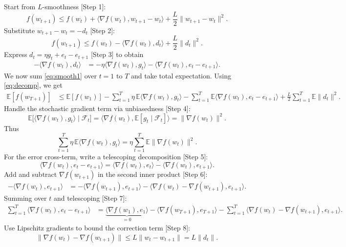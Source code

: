 \documentclass[11pt]{article}
\newcommand{\E}{\mathbb{E}}
\begin{document}
Start from $L$-smoothness [Step 1]:
\[
f(w_{t+1}) \le f(w_t) + \langle \nabla f(w_t), w_{t+1}-w_t\rangle + \frac{L}{2}\|w_{t+1}-w_t\|^2.
\]
Substitute $w_{t+1}-w_t = -d_t$ [Step 2]:
\begin{equation}\label{eq:smooth1}
f(w_{t+1}) \le f(w_t) - \langle \nabla f(w_t), d_t\rangle + \frac{L}{2}\|d_t\|^2.
\end{equation}
Express $d_t = \eta g_t + e_t - e_{t+1}$ [Step 3] to obtain
\begin{align}
- \langle \nabla f(w_t), d_t\rangle
&= -\eta \langle \nabla f(w_t), g_t\rangle - \langle \nabla f(w_t), e_t - e_{t+1}\rangle. \label{eq:decomp}
\end{align}
We now sum \eqref{eq:smooth1} over $t=1$ to $T$ and take total expectation. Using \eqref{eq:decomp}, we get
\begin{align}
\E[f(w_{T+1})]
&\le \E[f(w_1)] - \sum_{t=1}^T \eta\, \E\langle \nabla f(w_t), g_t\rangle - \sum_{t=1}^T \E\langle \nabla f(w_t), e_t - e_{t+1}\rangle + \frac{L}{2}\sum_{t=1}^T \E\|d_t\|^2. \label{eq:master1}
\end{align}
Handle the stochastic gradient term via unbiasedness [Step 4]:
\[
\E\bigl[\langle \nabla f(w_t), g_t\rangle \mid \mathcal{F}_t\bigr] = \langle \nabla f(w_t), \E[g_t \mid \mathcal{F}_t]\rangle = \|\nabla f(w_t)\|^2.
\]
Thus
\begin{equation}\label{eq:sgd-term}
\sum_{t=1}^T \eta\, \E\langle \nabla f(w_t), g_t\rangle = \eta \sum_{t=1}^T \E\|\nabla f(w_t)\|^2.
\end{equation}
For the error cross-term, write a telescoping decomposition [Step 5]:
\[
\langle \nabla f(w_t), e_t - e_{t+1}\rangle
= \langle \nabla f(w_t), e_t\rangle - \langle \nabla f(w_t), e_{t+1}\rangle.
\]
Add and subtract $\nabla f(w_{t+1})$ in the second inner product [Step 6]:
\begin{align*}
- \langle \nabla f(w_t), e_{t+1}\rangle
&= - \langle \nabla f(w_{t+1}), e_{t+1}\rangle - \langle \nabla f(w_t) - \nabla f(w_{t+1}), e_{t+1}\rangle.
\end{align*}
Summing over $t$ and telescoping [Step 7]:
\begin{align}
\sum_{t=1}^T \langle \nabla f(w_t), e_t - e_{t+1}\rangle
&= \underbrace{\langle \nabla f(w_1), e_1\rangle}_{=0} - \langle \nabla f(w_{T+1}), e_{T+1}\rangle - \sum_{t=1}^T \langle \nabla f(w_t) - \nabla f(w_{t+1}), e_{t+1}\rangle. \label{eq:telescoping}
\end{align}
Use Lipschitz gradients to bound the correction term [Step 8]:
\[
\|\nabla f(w_t) - \nabla f(w_{t+1})\| \le L\|w_t - w_{t+1}\| = L\|d_t\|.
\]
\end{document}
